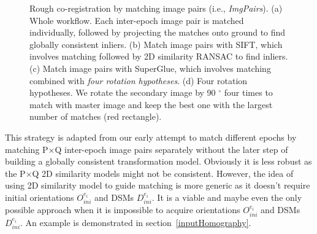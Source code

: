 \begin{figure}[htbp]
\begin{center}
{\begin{minipage}[t]{0.8\linewidth}
    \end{minipage}%
}
        \caption{Rough co-registration by matching image pairs (i.e., \textit{ImgPairs}). (a) Whole workflow. Each inter-epoch image pair is matched individually, followed by projecting the matches onto ground to find globally consistent inliers. (b) Match image pairs with SIFT, which involves matching followed by 2D similarity RANSAC to find inliers. (c) Match image pairs with SuperGlue, which involves matching combined with \textit{four rotation hypotheses}. (d) Four rotation hypotheses. We rotate the secondary image by 90 $^\circ$ four times to match with master image and keep the best one with the largest number of matches (red rectangle).}
        \label{WorkflowImgPair}
    \end{center}
\end{figure}

This strategy is adapted from our early attempt to match different epochs by matching P$\times$Q inter-epoch image pairs separately without the later step of building a globally consistent transformation model.  Obviously it is less robust as the P$\times$Q 2D similarity models might not be consistent.
However, the idea of using 2D similarity model to guide matching is more generic as it doesn't require initial orientations $O_{ini}^{e_i}$ and \ac{DSM}s $D_{ini}^{e_i}$. It is a viable and maybe even the only possible approach when it is impossible to acquire orientations $O_{ini}^{e_i}$ and \ac{DSM}s $D_{ini}^{e_i}$. An example is demonstrated in section~\ref{inputHomography}. %


